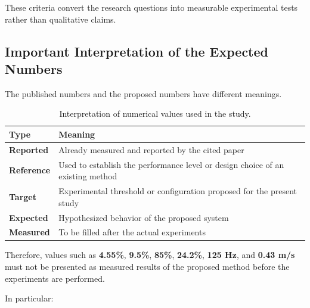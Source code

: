 \documentclass[journal]{IEEEtran}
\begin{document}
These criteria convert the research questions into measurable
experimental tests rather than qualitative claims.


\subsection{Important Interpretation of the Expected Numbers}

The published numbers and the proposed numbers have different meanings.

\begin{table}[t]
\centering
\caption{Interpretation of numerical values used in the study.}
\label{tab:number_interpretation}
\renewcommand{\arraystretch}{1.25}

\begin{tabular}{l l}
\toprule
\textbf{Type}
&
\textbf{Meaning}
\\
\midrule

\textbf{Reported}
&
Already measured and reported by the cited paper
\\

\textbf{Reference}
&
Used to establish the performance level or design choice of an
existing method
\\

\textbf{Target}
&
Experimental threshold or configuration proposed for the present
study
\\

\textbf{Expected}
&
Hypothesized behavior of the proposed system
\\

\textbf{Measured}
&
To be filled after the actual experiments
\\

\bottomrule
\end{tabular}
\end{table}

Therefore, values such as \textbf{4.55\%}, \textbf{9.5\%}, \textbf{85\%},
\textbf{24.2\%}, \textbf{125 Hz}, and \textbf{0.43 m/s} must not be
presented as measured results of the proposed method before the
experiments are performed.

In particular:
\end{document}
